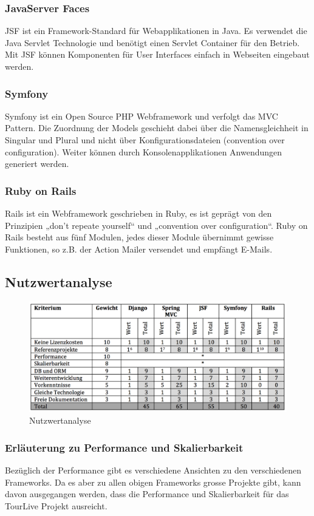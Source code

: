 \subsubsection{JavaServer Faces}
JSF ist ein Framework-Standard für Webapplikationen in Java. Es verwendet die Java Servlet Technologie und benötigt einen Servlet Container für den Betrieb. Mit JSF können Komponenten für User Interfaces einfach in Webseiten eingebaut werden. 
\subsubsection{Symfony}
Symfony ist ein Open Source PHP Webframework und verfolgt das MVC Pattern. Die Zuordnung der Models geschieht dabei über die Namensgleichheit in Singular und Plural und nicht über Konfigurationsdateien (convention over configuration). Weiter können durch Konsolenapplikationen Anwendungen generiert werden.
\subsubsection{Ruby on Rails}
Rails ist ein Webframework geschrieben in Ruby, es ist geprägt von den Prinzipien „don’t repeate yourself“ und „convention over configuration“. Ruby on Rails besteht aus fünf Modulen, jedes dieser Module übernimmt gewisse Funktionen, so z.B. der Action Mailer versendet und empfängt E-Mails.
\subsection{Nutzwertanalyse}
\begin{figure}[H]
	\includegraphics[width=130mm]{images/tourliveweb/nutzwertanalyse.png}
	\caption{Nutzwertanalyse}
\end{figure}
\subsubsection{Erläuterung zu Performance und Skalierbarkeit}
Bezüglich der Performance gibt es verschiedene Ansichten zu den verschiedenen Frameworks. Da es aber zu allen obigen Frameworks grosse Projekte gibt, kann davon ausgegangen werden, dass die Performance und Skalierbarkeit für das TourLive Projekt ausreicht.
